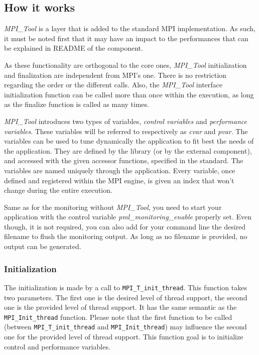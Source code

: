 \documentclass[notitlepage]{article}
\newcommand{\mpit}[1]{\textit{MPI\_Tool#1}}
\begin{document}
\subsection{How it works}

\mpit{} is a layer that is added to the standard MPI
implementation. As such, it must be noted first that it may have an
impact to the performances that can be explained in README of the
component.

As these functionality are orthogonal to the core ones, \mpit{}
initialization and finalization are independent from MPI's one. There
is no restriction regarding the order or the different calls. Also,
the \mpit{} interface initialization function can be called more than
once within the execution, as long as the finalize function is called
as many times.

\mpit{} introduces two types of variables, \textit{control variables}
and \textit{performance variables}. These variables will be referred to
respectively as \textit{cvar} and \textit{pvar}. The variables can be
used to tune dynamically the application to fit best the needs of the
application. They are defined by the library (or by the external
component), and accessed with the given accessor functions, specified
in the standard. The variables are named uniquely through the
application. Every variable, once defined and registered within the
MPI engine, is given an index that won't change during the entire
execution.

Same as for the monitoring without \mpit{}, you need to start your
application with the control variable \textit{pml\_monitoring\_enable}
properly set. Even though, it is not required, you can also add for
your command line the desired filename to flush the monitoring
output. As long as no filename is provided, no output can be
generated.

\subsubsection{Initialization}

The initialization is made by a call to \texttt{MPI\_T\_init\_thread}.
This function takes two parameters. The first one is the desired level
of thread support, the second one is the provided level of thread
support. It has the same semantic as the \texttt{MPI\_Init\_thread}
function. Please note that the first function to be called (between
\texttt{MPI\_T\_init\_thread} and \texttt{MPI\_Init\_thread}) may
influence the second one for the provided level of thread
support. This function goal is to initialize control and performance
variables.
\end{document}
